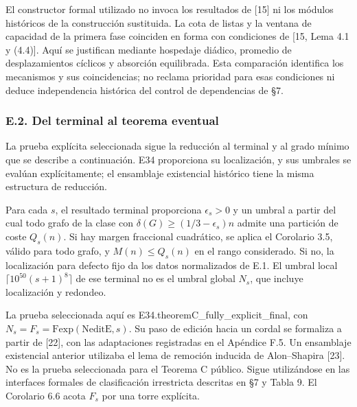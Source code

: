 \documentclass[spanish,11pt,a4paper]{article}
\begin{document}
El constructor formal utilizado no invoca los resultados de {[}15{]} ni los módulos históricos de la construcción sustituida. La cota de listas y la ventana de capacidad de la primera fase coinciden en forma con condiciones de {[}15, Lema 4.1 y (4.4){]}. Aquí se justifican mediante hospedaje diádico, promedio de desplazamientos cíclicos y absorción equilibrada. Esta comparación identifica los mecanismos y sus coincidencias; no reclama prioridad para esas condiciones ni deduce independencia histórica del control de dependencias de §7.

\subsubsection{E.2. Del terminal al teorema eventual}\label{e.2.-del-terminal-al-teorema-eventual}

La prueba explícita seleccionada sigue la reducción al terminal y al grado mínimo que se describe a continuación. E34 proporciona su localización, y sus umbrales se evalúan explícitamente; el ensamblaje existencial histórico tiene la misma estructura de reducción.

Para cada \(s\), el resultado terminal proporciona \(\epsilon_s>0\) y un umbral a partir del cual todo grafo de la clase con \(\delta(G)\ge(1/3-\epsilon_s)n\) admite una partición de coste \(Q_s(n)\). Si hay margen fraccional cuadrático, se aplica el Corolario 3.5, válido para todo grafo, y \(M(n)\le Q_s(n)\) en el rango considerado. Si no, la localización para defecto fijo da los datos normalizados de E.1. El umbral local \(\lceil10^{50}(s+1)^8\rceil\) de ese terminal no es el umbral global \(N_s\), que incluye localización y redondeo.

La prueba seleccionada aquí es {\ttfamily\small E34.\discretionary{\hbox{\ensuremath{\hookrightarrow}}}{}{}theoremC\_\discretionary{\hbox{\ensuremath{\hookrightarrow}}}{}{}fully\_\discretionary{\hbox{\ensuremath{\hookrightarrow}}}{}{}explicit\_\discretionary{\hbox{\ensuremath{\hookrightarrow}}}{}{}final}, con \(N_s=F_s=\mathrm{Fexp}(\mathrm{NeditE},s)\). Su paso de edición hacia un cordal se formaliza a partir de {[}22{]}, con las adaptaciones registradas en el Apéndice F.5. Un ensamblaje existencial anterior utilizaba el lema de remoción inducida de Alon--Shapira {[}23{]}. No es la prueba seleccionada para el Teorema C público. Sigue utilizándose en las interfaces formales de clasificación irrestricta descritas en §7 y Tabla 9. El Corolario 6.6 acota \(F_s\) por una torre explícita.
\end{document}
